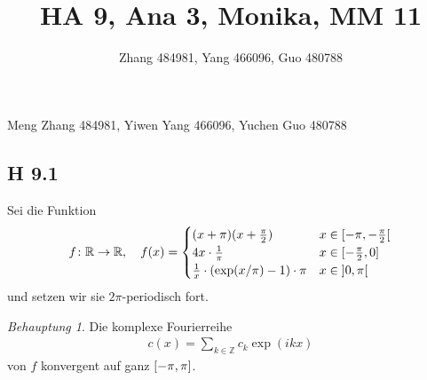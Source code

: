 \documentclass[draft,a5paper]{article}
\title{HA 9, Ana 3, Monika, MM 11}
\author{Zhang 484981, Yang 466096, Guo 480788}
\theoremstyle{remark}
\newtheorem*{Behauptung}{Behauptung}
\begin{document}
\maketitle
\begin{center}
  Meng Zhang 484981, Yiwen Yang 466096, Yuchen Guo 480788
\end{center}

\subsection{H 9.1}
Sei die Funktion
\begin{align*}
  f\colon \mathbb{R} \to \mathbb{R}, \quad f(x) =
  \begin{cases}
    (x + \pi)(x + \frac{\pi}{2}) & x \in \rinterval{-\pi}{-\frac{\pi}{2}} \\
    4x \cdot \frac{1}{\pi} & x \in \interval{-\frac{\pi}{2}}{0} \\
    \frac{1}{x} \cdot (\exp(x / \pi) - 1) \cdot \pi & x \in \ointerval{0}{\pi}
  \end{cases}
\end{align*}
und setzen wir sie \(2\pi\)-periodisch fort.
\begin{Behauptung}
  Die komplexe Fourierreihe
  \begin{align*}
    c(x) = \sum_{k \in \mathbb{Z}}{c_{k} \exp (ikx)}
  \end{align*}
  von \(f\) konvergent auf ganz \(\interval{-\pi}{\pi}\).
\end{Behauptung}
\end{document}
